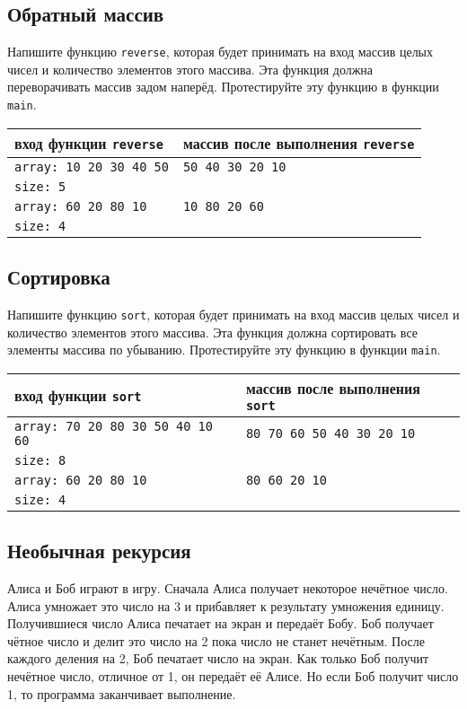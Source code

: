 \documentclass{article}
\begin{document}
\subsection{Обратный массив}
Напишите функцию \texttt{reverse}, которая будет принимать на вход массив целых чисел и количество элементов этого массива. Эта функция должна переворачивать массив задом наперёд. Протестируйте эту функцию в функции \texttt{main}.
\begin{center}
\begin{tabular}{ l | l }
 вход функции \texttt{reverse} & массив после выполнения \texttt{reverse} \\ \hline
 \texttt{array: 10 20 30 40 50} & \texttt{50 40 30 20 10} \\
 \texttt{size: 5} & \\ \hline
 \texttt{array: 60 20 80 10} & \texttt{10 80 20 60} \\
 \texttt{size: 4} & \\
\end{tabular}
\end{center} 


\subsection{Сортировка}
Напишите функцию \texttt{sort}, которая будет принимать на вход массив целых чисел и количество элементов этого массива. Эта функция должна сортировать все элементы массива по убыванию. Протестируйте эту функцию в функции \texttt{main}.
\begin{center}
\begin{tabular}{ l | l }
 вход функции \texttt{sort} & массив после выполнения \texttt{sort} \\ \hline
 \texttt{array: 70 20 80 30 50 40 10 60} & \texttt{80 70 60 50 40 30 20 10} \\
 \texttt{size: 8} & \\ \hline
 \texttt{array: 60 20 80 10} & \texttt{80 60 20 10} \\
 \texttt{size: 4} & \\
\end{tabular}
\end{center} 

\subsection{Необычная рекурсия}
Алиса и Боб играют в игру. Сначала Алиса получает некоторое нечётное число. Алиса умножает это число на 3 и прибавляет к результату умножения единицу. Получившиеся число Алиса печатает на экран и передаёт Бобу. Боб получает чётное число и делит это число на 2 пока число не станет нечётным. После каждого деления на 2, Боб печатает число на экран. Как только Боб получит нечётное число, отличное от 1, он передаёт её Алисе. Но если Боб получит число 1, то программа заканчивает выполнение.
\end{document}
